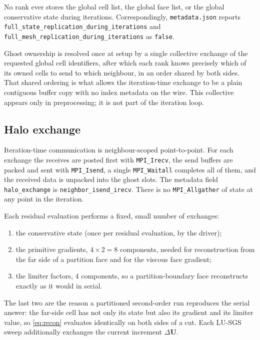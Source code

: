 No rank ever stores the global cell list, the global face list, or the global
conservative state during iterations. Correspondingly,
\texttt{metadata.json} reports
\texttt{full\_state\_replication\_during\_iterations} and
\texttt{full\_mesh\_replication\_during\_iterations} as \texttt{false}.

Ghost ownership is resolved once at setup by a single collective exchange of the
requested global cell identifiers, after which each rank knows precisely which of
its owned cells to send to which neighbour, in an order shared by both sides. That
shared ordering is what allows the iteration-time exchange to be a plain
contiguous buffer copy with no index metadata on the wire. This collective appears
only in preprocessing; it is not part of the iteration loop.

\subsection{Halo exchange}

Iteration-time communication is neighbour-scoped point-to-point. For each
exchange the receives are posted first with \texttt{MPI\_Irecv}, the send buffers
are packed and sent with \texttt{MPI\_Isend}, a single \texttt{MPI\_Waitall}
completes all of them, and the received data is unpacked into the ghost slots.
The metadata field \texttt{halo\_exchange} is
\texttt{neighbor\_isend\_irecv}. There is no \texttt{MPI\_Allgather} of state at
any point in the iteration.

Each residual evaluation performs a fixed, small number of exchanges:

\begin{enumerate}
  \item the conservative state (once per residual evaluation, by the driver);
  \item the primitive gradients, $4\times2=8$ components, needed for
  reconstruction from the far side of a partition face and for the viscous face
  gradient;
  \item the limiter factors, 4 components, so a partition-boundary face
  reconstructs exactly as it would in serial.
\end{enumerate}

The last two are the reason a partitioned second-order run reproduces the serial
answer: the far-side cell has not only its state but also its gradient and its
limiter value, so \cref{eq:recon} evaluates identically on both sides of a cut.
Each LU-SGS sweep additionally exchanges the current increment
$\Delta\mathbf{U}$.

